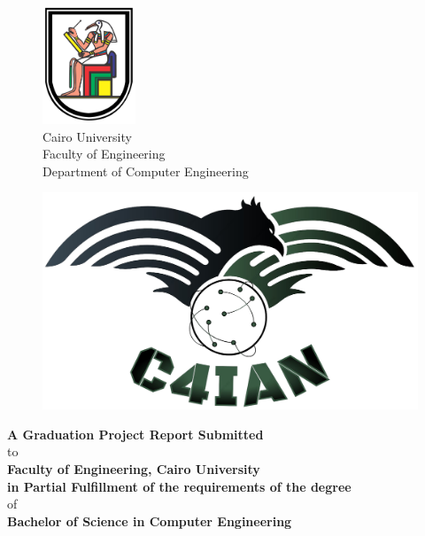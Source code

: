 \pagecolor{gpCoverBGColor}\afterpage{\nopagecolor}
\thispagestyle{empty}
{\color{gpCoverTextColor}
\begin{figure}
\includegraphics[width=1.09in]{images/cu-logo.png}\\
{\color{gpCoverTextColor} 
Cairo University\\
Faculty of Engineering\\
Department of Computer Engineering
}
\vspace{30pt}
\end{figure}

\begin{center}
    \vspace{10pt}
    {\fontsize{32}{50} \selectfont \textbf{\gpProject{}}}
    \vspace{15pt}
    
    \begin{figure}[H]
    \centering
    \includegraphics[width=0.5\linewidth]{images/logo.png}
    \label{fig:logo}
    \end{figure}

    \vspace{10pt}
    \textbf{A Graduation Project Report Submitted}
    \vspace{3pt}\\
    to
    \vspace{3pt}\\
    \textbf{Faculty of Engineering, Cairo University} 
    \vspace{3pt}\\
    \textbf{in Partial Fulfillment of the requirements of the degree}
    \vspace{3pt}\\
    of
    \vspace{3pt}\\
    \textbf{Bachelor of Science in Computer Engineering}
    \vspace{10pt}
    

\end{center}}

